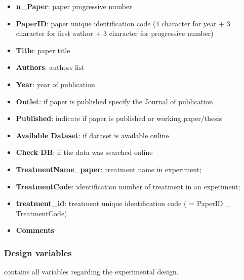 \documentclass[
]{article}
\providecommand{\tightlist}{%
  \setlength{\itemsep}{0pt}\setlength{\parskip}{0pt}}
\begin{document}
\begin{itemize}
\tightlist
\item
  \textbf{n\_Paper}: paper progressive number
\item
  \textbf{PaperID}: paper unique identification code (4 character for
  year + 3 character for first author + 3 character for progressive
  number)
\item
  \textbf{Title}: paper title
\item
  \textbf{Authors}: authors list
\item
  \textbf{Year}: year of publication
\item
  \textbf{Outlet}: if paper is published specify the Journal of
  publication
\item
  \textbf{Published}: indicate if paper is published or working
  paper/thesis
\item
  \textbf{Available Dataset}: if dataset is available online
\item
  \textbf{Check DB}: if the data was searched online
\item
  \textbf{TreatmentName\_paper}: treatment name in experiment;
\item
  \textbf{TreatmentCode}: identification number of treatment in an
  experiment;
\item
  \textbf{treatment\_id}: treatment unique identification code ( =
  PaperID \_ TreatmentCode)
\item
  \textbf{Comments}
\end{itemize}

\hypertarget{design-variables}{%
\subsubsection{Design variables}\label{design-variables}}

contains all variables regarding the experimental design.
\end{document}
